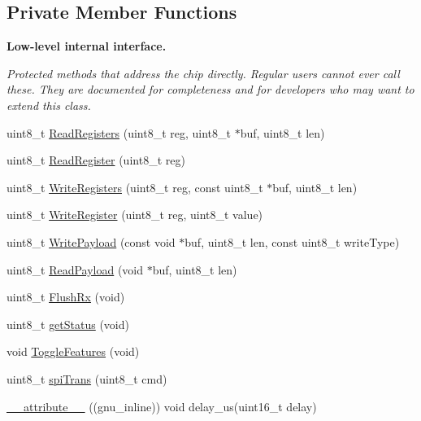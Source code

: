 \subsection*{Private Member Functions}
\begin{Indent}{\bf Low-\/level internal interface.}\par
{\em Protected methods that address the chip directly. Regular users cannot ever call these. They are documented for completeness and for developers who may want to extend this class. }\begin{DoxyCompactItemize}
\item 
uint8\+\_\+t \hyperlink{classNRF24L01_a9766146f8b6bcab59e91e7545484c401}{Read\+Registers} (uint8\+\_\+t reg, uint8\+\_\+t $\ast$buf, uint8\+\_\+t len)
\item 
uint8\+\_\+t \hyperlink{classNRF24L01_a6fc7da02296e9f91908e89438ba67901}{Read\+Register} (uint8\+\_\+t reg)
\item 
uint8\+\_\+t \hyperlink{classNRF24L01_ac7d69c51eca87f16fa3a30b5e8aa85cb}{Write\+Registers} (uint8\+\_\+t reg, const uint8\+\_\+t $\ast$buf, uint8\+\_\+t len)
\item 
uint8\+\_\+t \hyperlink{classNRF24L01_abfaaa54aff7ce60c4c844dd540c47af5}{Write\+Register} (uint8\+\_\+t reg, uint8\+\_\+t value)
\item 
uint8\+\_\+t \hyperlink{classNRF24L01_a9abae657dc54d97b6eb63f33c83e9f59}{Write\+Payload} (const void $\ast$buf, uint8\+\_\+t len, const uint8\+\_\+t write\+Type)
\item 
uint8\+\_\+t \hyperlink{classNRF24L01_ad733911b261f73964817dad526745716}{Read\+Payload} (void $\ast$buf, uint8\+\_\+t len)
\item 
uint8\+\_\+t \hyperlink{classNRF24L01_a83cfc941bafe563f38e183504ee8533c}{Flush\+Rx} (void)
\item 
uint8\+\_\+t \hyperlink{classNRF24L01_a95faa729cb8245516e9eb0248c6d9b0f}{get\+Status} (void)
\item 
void \hyperlink{classNRF24L01_aceeaa16f91d7c5fd6a429a6adf678bd4}{Toggle\+Features} (void)
\item 
uint8\+\_\+t \hyperlink{classNRF24L01_ab604b1e177e4812e33ebc39287503197}{spi\+Trans} (uint8\+\_\+t cmd)
\item 
\hyperlink{classNRF24L01_ad796eb9996a6b528534d1ac2ae2d37cd}{\+\_\+\+\_\+attribute\+\_\+\+\_\+} ((gnu\+\_\+inline)) void delay\+\_\+us(uint16\+\_\+t delay)
\end{DoxyCompactItemize}
\end{Indent}
